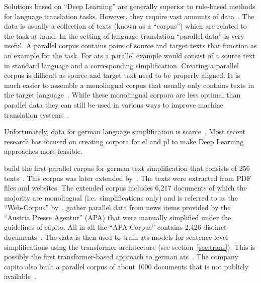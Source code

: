 Solutions based on \enquote{Deep Learning} are generally superior to rule-based methods for language translation tasks.
However, they require vast amounts of data~\autocite{otter2019survey}.
The data is usually a collection of texts (known as a \enquote{corpus}) which are related to the task at hand.
In the setting of language translation \enquote{parallel data} is very useful.
A parallel corpus contains pairs of source and target texts that function as an example for the task.
For \gls{ats} a parallel example would consist of a source text in standard language and a corresponding simplification.
Creating a parallel corpus is difficult as source and target text need to be properly aligned.
It is much easier to assemble a monolingual corpus that usually only contains texts in the target language~\autocite{chan2023routledge}.
While these monolingual corpora are less optimal than parallel data they can still be used in various ways to improve machine translation systems~\autocite{lample2018unsupervised, burlot2019using, chan2023routledge}.

Unfortunately, data for german language simplification is scarce~\autocite{Ansch_tz_2023}.
Most recent research has focused on creating corpora for \gls{el} and \gls{pl} to make Deep Learning approaches more feasible.

\textcite{klaper-etal-2013-building} build the first parallel corpus for german text simplification that consists of 256 texts~\autocite{ebeling2022}.
This corpus was later extended by~\textcite{battisti-etal-2020-corpus}.
The texts were extracted from PDF files and websites.
The extended corpus includes 6,217 documents of which the majority are monolingual (i.e.\ simplifications only) and is referred to as the \enquote{Web-Corpus} by~\textcite{ebeling2022}.
\textcite{sauberli-etal-2020-benchmarking} gather parallel data from news items provided by the \enquote{Austria Presse Agentur} (APA) that were manually simplified under the guidelines of \gls{capito}.
All in all the \enquote{APA-Corpus} contains 2,426 distinct documents~\autocite{ebeling2022}.
The data is then used to train \gls{ats}-models for sentence-level simplifications using the transformer architecture (see section~\ref{sec:trans}). %
This is possibly the first transformer-based approach to german \gls{ats}~\autocite{Ansch_tz_2023}.
The company \gls{capito} also built a parallel corpus of about 1000 documents that is not publicly available~\autocite{ebeling2022}.

